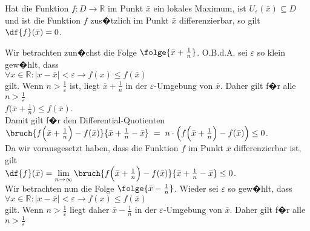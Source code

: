 \begin{Satz}
Hat die Funktion $f: D \rightarrow \mathbb{R}$ im Punkt $\bar{x}$ ein lokales
Maximum, ist $U_\varepsilon(\bar{x}) \subseteq D$ und ist die Funktion $f$ zus�tzlich im Punkt $\bar{x}$ differenzierbar, so gilt 
\\[0.3cm]
\hspace*{1.3cm}
$\df{f}(\bar{x}) = 0$.
\end{Satz}

\proof
Wir betrachten zun�chst die Folge $\folge{\bar{x} + \frac{1}{n}}$.
O.B.d.A. sei $\varepsilon$ so klein gew�hlt, dass 
\\[0.2cm]
\hspace*{1.3cm}
$\forall x \in \mathbb{R} : |x - \bar{x}| < \varepsilon \rightarrow f(x) \leq f(\bar{x})$
\\[0.2cm]
gilt.  Wenn $n>\frac{1}{\varepsilon}$ ist, liegt  $\bar{x} + \frac{1}{n}$ in der
$\varepsilon$-Umgebung von $\bar{x}$.  Daher gilt f�r alle $n > \frac{1}{\varepsilon}$
\\[0.3cm]
\hspace*{1.3cm}
 $f\bigl(\bar{x} + \frac{1}{n}\bigr) \leq f(\bar{x})$. 
\\[0.3cm]
Damit gilt f�r den Differential-Quotienten
\\[0.3cm]
\hspace*{1.3cm}
$\bruch{f\Bigl(\bar{x} + \frac{1}{n}\Bigr) - f(\bar{x})}{\bar{x} + \frac{1}{n} - \bar{x}} \;=\;
 n \cdot \left(f\Bigl(\bar{x} + \frac{1}{n}\Bigr) - f(\bar{x})\right) \leq 0$. 
\\[0.3cm]
Da wir vorausgesetzt haben, dass die Funktion $f$ im Punkt $\bar{x}$ differenzierbar ist,
gilt 
\\[0.3cm]
\hspace*{1.3cm}
$\df{f}(\bar{x}) = \lim\limits_{n \rightarrow \infty} \bruch{f\Bigl(\bar{x} + \frac{1}{n}\Bigr) - f(\bar{x})}{\bar{x} + \frac{1}{n} - \bar{x}} \leq 0$.
\\[0.3cm]
Wir betrachten nun die Folge $\folge{\bar{x} - \frac{1}{n}}$.
Wieder sei $\varepsilon$ so gew�hlt, dass 
\\[0.2cm]
\hspace*{1.3cm}
$\forall x \in \mathbb{R} : |x - \bar{x}| < \varepsilon \rightarrow f(x) \leq f(\bar{x})$
\\[0.2cm]
gilt.  Wenn $n>\frac{1}{\varepsilon}$ liegt daher  $\bar{x} - \frac{1}{n}$ in der
$\varepsilon$-Umgebung von $\bar{x}$.  Daher gilt f�r alle $n > \frac{1}{\varepsilon}$
